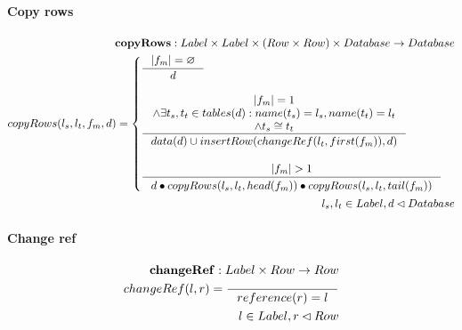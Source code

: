 \documentclass[11pt]{article}
\begin{document}
\paragraph{Copy rows}
\begin{align*}
	\mathbf{copyRows} : Label \times Label \times (Row \times Row) \times Database \rightarrow Database \\
	copyRows(l_s, l_t, f_m, d) = \begin{cases}
 	\inference{|f_m| = \varnothing}{d} \\\\
 	\inference{|f_m| = 1 \\ \wedge \exists t_s, t_t \in tables(d) : name(t_s) = l_s, name(t_t) = l_t \\ \wedge t_s \cong t_t }{data(d) \cup insertRow(changeRef(l_t, first(f_m)), d)} \\\\
 	\inference{|f_m| > 1}{\begin{gathered}
		 d \bullet copyRows(l_s, l_t, head(f_m)) \bullet copyRows(l_s, l_t, tail(f_m))
	\end{gathered}}
  \end{cases} \\
  l_s, l_t \in Label, d \lhd Database
\end{align*}

\paragraph{Change ref}
\begin{align*}
	\mathbf{changeRef} : Label \times Row \rightarrow Row \\
	changeRef(l, r) = \inference{}{reference(r) = l } \\
	l \in Label, r \lhd Row
\end{align*}



\end{document}
